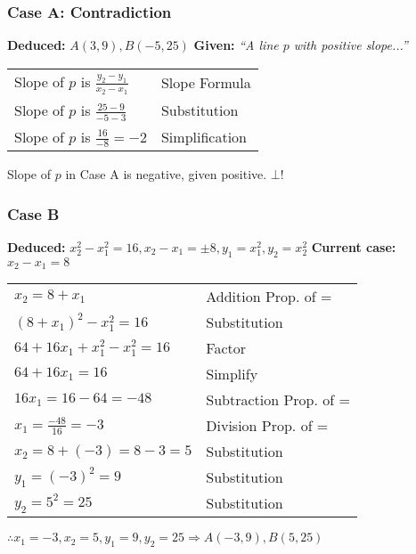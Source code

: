\documentclass[mathserif]{beamer}
\begin{document}
\begin{frame}
\frametitle{Case A: Contradiction}

\textbf{Deduced: } $A(3,9),B(-5,25)$\newline
\textbf{Given: } \textit{``A line $p$ with positive slope...''}

\begin{center}
	\renewcommand{\arraystretch}{1.3}
	\begin{tabular}{l | l}
		Slope of $p$ is $\frac{y_2-y_1}{x_2-x_1}$ & Slope Formula \\
		Slope of $p$ is $\frac{25-9}{-5-3}$ & Substitution \\
		Slope of $p$ is $\frac{16}{-8}=-2$ & Simplification
		\end{tabular}
	
\end{center}

Slope of $p$ in Case A is negative, given positive. $\bot$!

\end{frame}
\begin{frame}
\frametitle{Case B}

	\textbf{Deduced:} $x_2^2-x_1^2=16, x_2-x_1=\pm 8, y_1=x_1^2, y_2=x_2^2$\newline
\textbf{Current case:} $x_2-x_1=8$

\begin{center}
	\renewcommand{\arraystretch}{1.2}
	\begin{tabular}{l | l}
		$x_2=8+x_1$ & Addition Prop. of = \\
		$(8+x_1)^2-x_1^2=16$ & Substitution \\
		$64+16x_1+x_1^2-x_1^2=16$ & Factor \\
		$64+16x_1=16$ & Simplify \\
		$16x_1=16-64=-48$ & Subtraction Prop. of = \\
		$x_1=\frac{-48}{16}=-3$ & Division Prop. of = \\
		$x_2=8+(-3)=8-3=5$ & Substitution \\
		$y_1=(-3)^2=9$ & Substitution \\
		$y_2=5^2=25$ & Substitution
	\end{tabular}

\end{center}

$\therefore x_1=-3,x_2=5,y_1=9,y_2=25 \Rightarrow A(-3,9), B(5,25)$
\end{frame}
\end{document}
